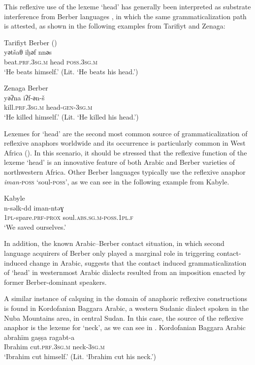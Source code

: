 \documentclass[output=paper]{langsci/langscibook}
\begin{document}
This reflexive use of the lexeme ‘head’ has generally been interpreted as substrate interference from Berber languages \citep[197]{ElAissati2011}, in which the same grammaticalization path is attested, as shown in the following examples from Tarifiyt and Zenaga: 

\ea\label{ex:key:}
{Tarifiyt Berber (\citealt[95]{Kossmann2000})}\\
\gll   yәtšaθ iḫәf nnәs\\
       beat.\textsc{prf.3sg.m} head \textsc{poss.3sg.m}\\
\glt   `He beats himself.' (Lit. ‘He beats his head.’)
\z

\ea\label{ex:key:}
{Zenaga Berber \citep[126]{Taine-Cheikh2008chapter}}\\
\gll   yәʔna iʔf-әn-š\\
       kill.\textsc{prf.3sg.m} head-\textsc{gen-3sg.m}\\
\glt   `He killed himself.' (Lit. ‘He killed his head.’)
\z

Lexemes for ‘head’ are the second most common source of grammaticalization of reflexive anaphors worldwide \citep{KönigTöpper2013} and its occurrence is particularly common in West Africa (\citealt[50]{Heine2011}). In this scenario, it should be stressed that the reflexive function of the lexeme ‘head’ is an innovative feature of both Arabic and Berber varieties of northwestern Africa. Other Berber languages typically use the reflexive anaphor \textit{iman-}\textsc{poss} ‘soul-\textsc{poss}’, as we can see in the following example from Kabyle.

\ea\label{ex:key:}
{Kabyle \citep{Mettouchi2012}}\\
\gll   n-səlk-dd       iman-ntəɣ\\
       \textsc{1pl}-spare.\textsc{prf-prox} soul.\textsc{abs.sg.m-poss.1pl.f}\\
\glt   `We saved ourselves.'\\
\z

In addition, the known Arabic–Berber contact situation, in which second language acquirers of Berber only played a marginal role in triggering contact-induced change in Arabic, suggests that the contact induced grammaticalization of ‘head’ in westernmost Arabic dialects resulted from an imposition enacted by former Berber-dominant speakers.  

A similar instance of calquing in the domain of anaphoric reflexive constructions is found in Kordofanian Baggara Arabic, a western Sudanic dialect spoken in the Nuba Mountains area, in central Sudan. In this case, the source of the reflexive anaphor is the lexeme for ‘neck’, as we can see in .  
\newpage
\ea\label{ex:key:20}
{Kordofanian Baggara Arabic \citep[176]{Manfredi2010}}\\
\gll  abrahīm gaṣṣa ragabt-a\\
       Ibrahim cut.\textsc{prf.3sg.m} neck-\textsc{3sg.m}\\
\glt   `Ibrahim cut himself.' (Lit. `Ibrahim cut his neck.')
\z
\end{document}
